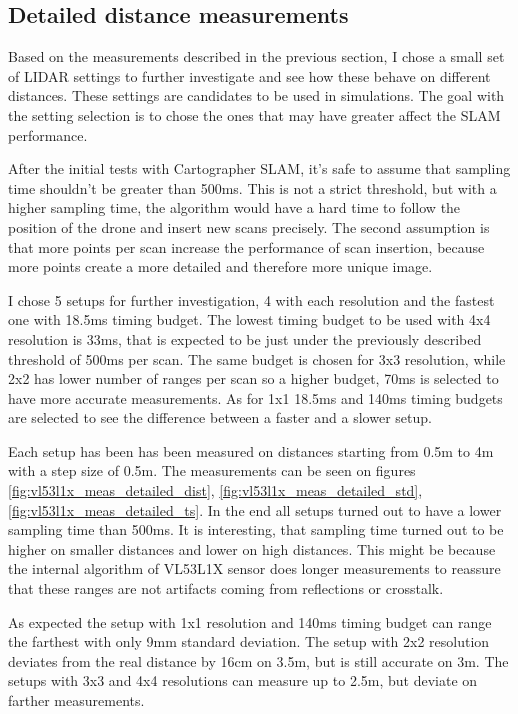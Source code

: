 \subsection{Detailed distance measurements}
Based on the measurements described in the previous section, I chose a small set of LIDAR settings 
to further investigate and see how these behave on different distances. These settings are 
candidates to be used in simulations. The goal with the setting selection is to chose the ones
that may have greater affect the SLAM performance.

After the initial tests with Cartographer SLAM, it's safe to assume that sampling time shouldn't be
greater than 500ms. This is not a strict threshold, but with a higher sampling time, the algorithm 
would have a hard time to follow the position of the drone and insert new scans precisely. The second
assumption is that more points per scan increase the performance of scan insertion, because more points
create a more detailed and therefore more unique image. 

I chose 5 setups for further investigation, 4 with each resolution and the fastest one with 18.5ms 
timing budget. The lowest timing budget to be used with 4x4 resolution is 33ms, that is expected to be
just under the previously described threshold of 500ms per scan. The same budget is chosen for 3x3 
resolution, while 2x2 has lower number of ranges per scan so a higher budget, 70ms is selected to 
have more accurate measurements. As for 1x1 18.5ms and 140ms timing budgets are selected to see
the difference between a faster and a slower setup.

Each setup has been has been measured on distances starting from 0.5m to 4m with a step size
of 0.5m. The measurements can be seen on figures \ref{fig:vl53l1x_meas_detailed_dist},
\ref{fig:vl53l1x_meas_detailed_std}, \ref{fig:vl53l1x_meas_detailed_ts}. In the end
all setups turned out to have a lower sampling time than 500ms. It is interesting, that
sampling time turned out to be higher on smaller distances and lower on high distances.
This might be because the internal algorithm of VL53L1X sensor does longer measurements
to reassure that these ranges are not artifacts coming from reflections or crosstalk.

As expected the setup with 1x1 resolution and 140ms timing budget can range the farthest 
with only 9mm standard deviation. The setup with 2x2 resolution deviates from the real 
distance by 16cm on 3.5m, but is still accurate on 3m. 
The setups with 3x3 and 4x4 resolutions can measure up to 2.5m, but deviate on farther 
measurements. 

